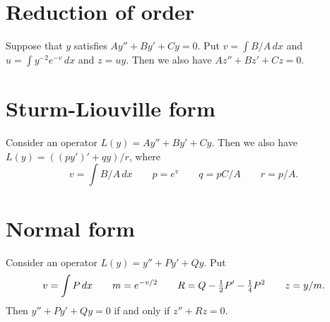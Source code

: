 \documentclass[reqno]{amsart}
\begin{document}
\section*{Reduction of order}

Suppose that $y$ satisfies $Ay''+By'+Cy=0$.  Put $v=\int B/A\,dx$ and
$u=\int y^{-2}e^{-v}\,dx$ and $z=uy$.  Then we also have
$Az''+Bz'+Cz=0$. 

\section*{Sturm-Liouville form}

Consider an operator $L(y)=Ay''+By'+Cy$.  Then we also have
$L(y)=((py')'+qy)/r$, where
\[ v = \int B/A\,dx
   \qquad p = e^v  
   \qquad q = pC/A
   \qquad r = p/A.
\]

\section*{Normal form}

Consider an operator $L(y)=y''+Py'+Qy$.  Put 
\[ v = \int P\,dx 
   \qquad m = e^{-v/2}
   \qquad R = Q - \tfrac{1}{2} P' - \tfrac{1}{4}P^2
   \qquad z = y/m.
\]
Then $y''+Py'+Qy=0$ if and only if $z''+Rz=0$.
\end{document}
